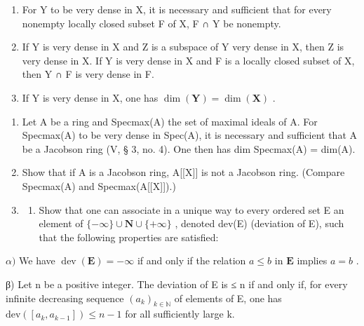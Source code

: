 \begin{enumerate}
\def\labelenumi{\alph{enumi})}
\item
  For Y to be very dense in X, it is necessary and sufficient that for every nonempty locally closed subset F of X, F ∩ Y be nonempty.
\item
  If Y is very dense in X and Z is a subspace of Y very dense in X, then Z is very dense in X. If Y is very dense in X and F is a locally closed subset of X, then Y ∩ F is very dense in F.
\item
  If Y is very dense in X, one has \(\dim(\mathbf{Y}) = \dim(\mathbf{X})\) .
\end{enumerate}

\begin{enumerate}
\def\labelenumi{\arabic{enumi})}
\setcounter{enumi}{1}
\item
  Let A be a ring and Specmax(A) the set of maximal ideals of A. For Specmax(A) to be very dense in Spec(A), it is necessary and sufficient that A be a Jacobson ring (V, § 3, no. 4). One then has dim Specmax(A) = dim(A).
\item
  Show that if A is a Jacobson ring, A{[}{[}X{]}{]} is not a Jacobson ring. (Compare Specmax(A) and Specmax(A{[}{[}X{]}{]}).)
\item
  \begin{enumerate}
  \def\labelenumii{\alph{enumii})}
  \tightlist
  \item
    Show that one can associate in a unique way to every ordered set E an element of \(\{-\infty\}\cup\mathbf{N}\cup\{+\infty\}\) , denoted dev(E) (deviation of E), such that the following properties are satisfied:
  \end{enumerate}
\end{enumerate}

\(\alpha)\) We have \(\operatorname{dev}(\mathbf{E}) = -\infty\) if and only if the relation \(a \leqslant b\) in \(\mathbf{E}\) implies \(a = b\) .

β) Let n be a positive integer. The deviation of E is ≤ n if and only if, for every infinite decreasing sequence \((a_{k})_{k\in\mathbb{N}}\) of elements of E, one has \(\text{dev}([a_{k}, a_{k-1}]) \leqslant n - 1\) for all sufficiently large k.

